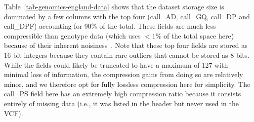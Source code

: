\documentclass[a4paper,num-refs]{oup-contemporary}
\begin{document}
\begin{table}
\begin{tabular}{llS[table-format=3.1]S[table-format=3.2]S[table-format=3.2]}
\bottomrule
\end{tabular}
\end{table}

Table~\ref{tab-genomics-england-data} shows that the dataset storage
size is dominated by a few columns with the top four
(call\_AD, call\_GQ, call\_DP and call\_DPF) accounting for 
90\% of the total. These fields are much less compressible
than genotype data (which uses $<1\%$ of the total space here)
because of their inherent noisiness~\citep{lin2020sparse}. 
Note that these top four fields are stored as 16 bit integers
because they contain rare outliers that cannot be stored as 
8 bits. While the fields could likely be truncated to have 
a maximum of 127 with minimal loss of information, 
the compression gains from doing so are relatively minor,
and we therefore opt for fully lossless compression here 
for simplicity. The call\_PS field here has an extremely high
compression ratio because it consists entirely of missing data
(i.e., it was listed in the header but never used in the VCF).
\end{document}
